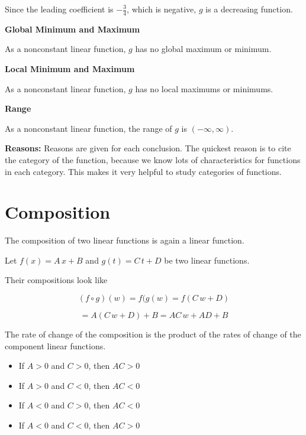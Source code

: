 \documentclass{ximera}
\begin{document}
\begin{example}
Since the leading coefficient is $-\frac{3}{4}$, which is negative, $g$ is a decreasing function. 



\textbf{Global Minimum and Maximum} 

As a nonconstant linear function, $g$ has no global maximum or minimum. 



\textbf{Local Minimum and Maximum} 

As a nonconstant linear function, $g$ has no local maximums or minimums. 



\textbf{Range} 

As a nonconstant linear function, the range of $g$ is $(-\infty, \infty)$. 



\end{example}

\textbf{Reasons:} Reasons are given for each conclusion.  The quickest reason is to cite the category of the function, because we know lots of characteristics for functions in each category.  This makes it very helpful to study categories of functions. 










\section*{Composition}



The composition of two linear functions is again a linear function.


Let $f(x) = A \, x + B$ and $g(t) = C \, t + D$ be two linear functions.


Their compositions look like

\[  (f \circ g)(w) = f(g(w) = f(C \, w + D) \]

\[  = A (C \, w + D) + B = A C \, w + A D + B   \]

The rate of change of the composition is the product of the rates of change of the component linear functions.

\begin{itemize}
\item If $A > 0$ and $C > 0$, then $A C > 0$
\item If $A > 0$ and $C < 0$, then $A C < 0$
\item If $A < 0$ and $C > 0$, then $A C < 0$
\item If $A < 0$ and $C < 0$, then $A C > 0$
\end{itemize}
\end{document}
